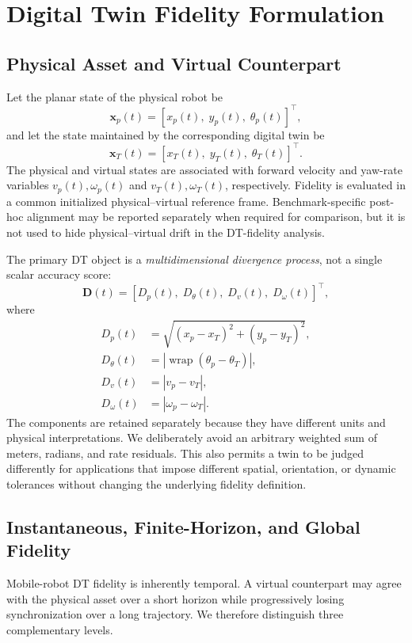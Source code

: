 \documentclass[conference]{IEEEtran}
\newcommand{\wrap}{\operatorname{wrap}}
\newcommand{\Dp}{D_{p}}
\newcommand{\Dtheta}{D_{\theta}}
\newcommand{\Dv}{D_{v}}
\newcommand{\Domega}{D_{\omega}}
\begin{document}
\section{Digital Twin Fidelity Formulation}
\label{sec:fidelity}

\subsection{Physical Asset and Virtual Counterpart}
Let the planar state of the physical robot be
\begin{equation}
\mathbf{x}_{p}(t) = [x_p(t),\; y_p(t),\; \theta_p(t)]^{\top},
\end{equation}
and let the state maintained by the corresponding digital twin be
\begin{equation}
\mathbf{x}_{T}(t) = [x_T(t),\; y_T(t),\; \theta_T(t)]^{\top}.
\end{equation}
The physical and virtual states are associated with forward velocity and yaw-rate variables $v_p(t),\omega_p(t)$ and $v_T(t),\omega_T(t)$, respectively. Fidelity is evaluated in a common initialized physical--virtual reference frame. Benchmark-specific post-hoc alignment may be reported separately when required for comparison, but it is not used to hide physical--virtual drift in the DT-fidelity analysis.

The primary DT object is a \emph{multidimensional divergence process}, not a single scalar accuracy score:
\begin{equation}
\mathbf{D}(t) = [\Dp(t),\; \Dtheta(t),\; \Dv(t),\; \Domega(t)]^{\top},
\label{eq:divergence_vector}
\end{equation}
where
\begin{align}
\Dp(t) &= \sqrt{(x_p-x_T)^2+(y_p-y_T)^2},\label{eq:dp}\\
\Dtheta(t) &= \left|\wrap\left(\theta_p-\theta_T\right)\right|,\label{eq:dtheta}\\
\Dv(t) &= |v_p-v_T|,\label{eq:dv}\\
\Domega(t) &= |\omega_p-\omega_T|.\label{eq:domega}
\end{align}
The components are retained separately because they have different units and physical interpretations. We deliberately avoid an arbitrary weighted sum of meters, radians, and rate residuals. This also permits a twin to be judged differently for applications that impose different spatial, orientation, or dynamic tolerances without changing the underlying fidelity definition.

\subsection{Instantaneous, Finite-Horizon, and Global Fidelity}
Mobile-robot DT fidelity is inherently temporal. A virtual counterpart may agree with the physical asset over a short horizon while progressively losing synchronization over a long trajectory. We therefore distinguish three complementary levels.
\end{document}
